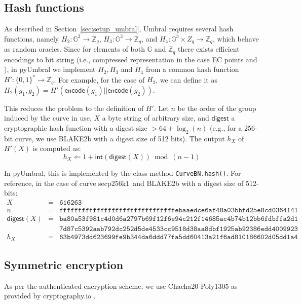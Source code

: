 \documentclass{amsart}
\newcommand{\pyumbral}{\textsf{pyUmbral}}
\newcommand{\secp}{\textsf{secp256k1}}
\begin{document}
\subsection{Hash functions}
As described in Section~\ref{sec:setup_umbral}, Umbral requires several hash functions, namely $H_2: \mathbb G^2 \to \mathbb Z_q$, $H_3: \mathbb G^3 \to \mathbb Z_q$, and $H_4: \mathbb G^3 \times Z_q \to \mathbb Z_q$, which behave as random oracles. Since for elements of both $\mathbb G$ and $\mathbb Z_q$ there exists efficient encodings to bit string (i.e., compressed representation in the case EC points and ), in \textsf{pyUmbral} we implement $H_2, H_3$ and $H_4$ from a common hash function $H': \{0,1\}^* \to \mathbb Z_q$. For example, for the case of $H_2$, we can define it as $H_2(g_1, g_2) = H'(\mathsf{encode}(g_1)||\mathsf{encode}(g_2))$.

This reduces the problem to the definition of $H'$. Let $n$ be the order of the group induced by the curve in use, $X$ a byte string of arbitrary size, and $\mathsf{digest}$ a cryptographic hash function with a digest size $> 64 + \log_2(n)$  (e.g., for a 256-bit curve, we use \textsf{BLAKE2b} with a digest size of 512 bits). The output $h_X$ of $H'(X)$ is computed as:
$$h_X \Leftarrow 1 + \mathsf{int}(\mathsf{digest}(X)) \bmod (n-1)$$

In \pyumbral, this is implemented by the class method \texttt{CurveBN.hash()}. 
For reference, in the case of curve \secp~and BLAKE2b with a digest size of 512-bits:
\begin{align*} 
X &= &\mathtt{616263}\\
n &= &\mathtt{fffffffffffffffffffffffffffffffebaaedce6af48a03bbfd25e8cd0364141} \\ 
\mathsf{digest}(X) &=  &\mathtt{ba80a53f981c4d0d6a2797b69f12f6e94c212f14685ac4b74b12bb6fdbffa2d1}\\
 & &\mathtt{7d87c5392aab792dc252d5de4533cc9518d38aa8dbf1925ab92386edd4009923}\\
h_X &= &\mathtt{63b4973dd623699fe9b344da6ddd77fa5dd60413a21f6ad810186602d05dd1a4}
\end{align*}

\subsection{Symmetric encryption}
As per the authenticated encryption scheme, we use Chacha20-Poly1305 as provided by cryptography.io \cite{chacha20-pyca}.
\end{document}
